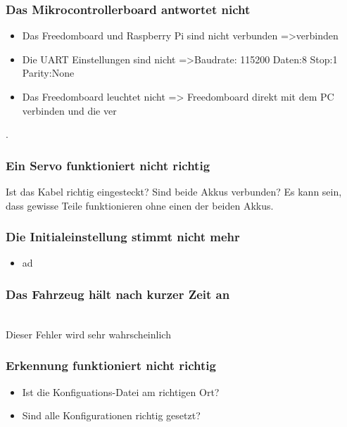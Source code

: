 \subsubsection{Das Mikrocontrollerboard antwortet nicht}
\begin{itemize}
\item Das Freedomboard und Raspberry Pi sind nicht verbunden =>verbinden
\item Die UART Einstellungen sind nicht =>Baudrate: 115200 Daten:8 Stop:1 Parity:None
\item Das Freedomboard leuchtet nicht => Freedomboard direkt mit dem PC verbinden und die ver

\end{itemize}
. 
\subsubsection{Ein Servo funktioniert nicht richtig}
Ist das Kabel richtig eingesteckt?
Sind beide Akkus verbunden? Es kann sein, dass gewisse Teile funktionieren ohne einen der beiden Akkus.
\subsubsection{Die Initialeinstellung stimmt nicht mehr}
\begin{itemize}
\item ad

\end{itemize}
\subsubsection{Das Fahrzeug hält nach kurzer Zeit an}\\[0.2cm]
Dieser Fehler wird sehr wahrscheinlich 

\subsubsection{Erkennung funktioniert nicht richtig}
\begin{itemize}
\item Ist die Konfiguations-Datei am richtigen Ort?
\item Sind alle Konfigurationen richtig gesetzt?
\end{itemize}

